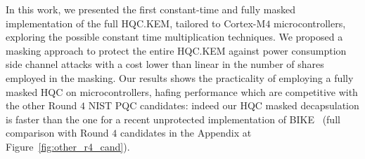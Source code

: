 In this work, we presented the first constant-time and fully masked implementation
of the full HQC.KEM, tailored to Cortex-M$4$ microcontrollers, exploring the possible
constant time multiplication techniques.
We proposed a masking approach to protect the entire HQC.KEM
against power consumption side channel attacks with a cost lower than linear
in the number of shares employed in the masking.
Our results shows the practicality of employing a fully masked
HQC on microcontrollers, hafing performance which are competitive with the other
Round $4$ NIST PQC candidates: indeed our HQC masked decapsulation is
faster than the one for a recent unprotected implementation of BIKE~\cite{DBLP:journals/tches/ChenCK21} (full comparison with Round $4$ candidates in the Appendix at   Figure~\ref{fig:other_r4_cand}).




